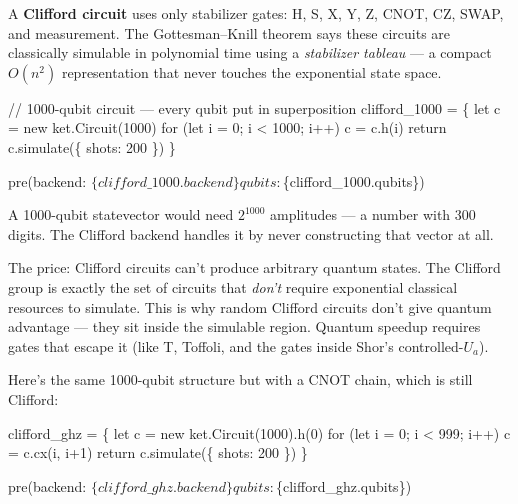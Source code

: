 \documentclass[
  11pt,
  letterpaper,
  oneside]{scrbook}
\newenvironment{Shaded}{\begin{snugshade}}{\end{snugshade}}
\newcommand{\NormalTok}[1]{\textcolor[rgb]{0.00,0.23,0.31}{#1}}
\begin{document}
A \textbf{Clifford circuit} uses only stabilizer gates: H, S, X, Y, Z,
CNOT, CZ, SWAP, and measurement. The Gottesman--Knill theorem says these
circuits are classically simulable in polynomial time using a
\emph{stabilizer tableau} --- a compact \(O(n^2)\) representation that
never touches the exponential state space.

\begin{Shaded}
\begin{Highlighting}[]
\NormalTok{// 1000{-}qubit circuit — every qubit put in superposition}
\NormalTok{clifford\_1000 = \{}
\NormalTok{  let c = new ket.Circuit(1000)}
\NormalTok{  for (let i = 0; i \textless{} 1000; i++) c = c.h(i)}
\NormalTok{  return c.simulate(\{ shots: 200 \})}
\NormalTok{\}}
\end{Highlighting}
\end{Shaded}

\begin{Shaded}
\begin{Highlighting}[]
\NormalTok{pre(\textasciigrave{}backend: $\{clifford\_1000.backend\}   qubits: $\{clifford\_1000.qubits\}\textasciigrave{})}
\end{Highlighting}
\end{Shaded}

A 1000-qubit statevector would need \(2^{1000}\) amplitudes --- a number
with 300 digits. The Clifford backend handles it by never constructing
that vector at all.

The price: Clifford circuits can't produce arbitrary quantum states. The
Clifford group is exactly the set of circuits that \emph{don't} require
exponential classical resources to simulate. This is why random Clifford
circuits don't give quantum advantage --- they sit inside the simulable
region. Quantum speedup requires gates that escape it (like T, Toffoli,
and the gates inside Shor's controlled-\(U_a\)).

Here's the same 1000-qubit structure but with a CNOT chain, which is
still Clifford:

\begin{Shaded}
\begin{Highlighting}[]
\NormalTok{clifford\_ghz = \{}
\NormalTok{  let c = new ket.Circuit(1000).h(0)}
\NormalTok{  for (let i = 0; i \textless{} 999; i++) c = c.cx(i, i+1)}
\NormalTok{  return c.simulate(\{ shots: 200 \})}
\NormalTok{\}}
\end{Highlighting}
\end{Shaded}

\begin{Shaded}
\begin{Highlighting}[]
\NormalTok{pre(\textasciigrave{}backend: $\{clifford\_ghz.backend\}   qubits: $\{clifford\_ghz.qubits\}\textasciigrave{})}
\end{Highlighting}
\end{Shaded}
\end{document}
